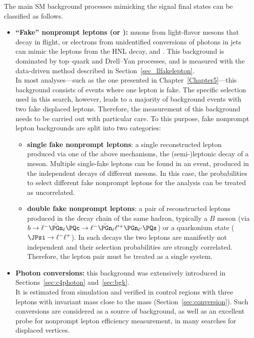 The main SM background processes mimicking the signal final states can be
classified as follows.
\begin{itemize}
\item \textbf{``Fake'' nonprompt leptons (\Pe or \PGm):}
  muons from light-flavor mesons that decay in flight, or electrons from
  unidentified conversions of photons in jets
  can mimic the \displ leptons from the HNL decay, \ltwo and
  \lthree.
  This background is dominated by top--quark and Drell--Yan processes,
  and is measured with the data-driven method described in
  Section~\ref{sec_llfakelepton}.\\
In most analyses---such as the one presented in Chapter~\ref{Chapter5}---this
background consists of events where one lepton is fake. 
The specific selection used in this search, however, leads to a majority of
background events with two fake displaced leptons. Therefore, the
measurement of this background needs to be carried out with particular care.
To this purpose, fake nonprompt lepton backgrounds are split into two
categories:
  \begin{itemize}
  \item \textbf{single fake nonprompt leptons}:
    a single reconstructed lepton produced via one of the above
    mechanisms, \eg the (semi-)leptonic decay of a meson.
    Multiple single-fake leptons can be found in an event,
    produced in the independent decays of different mesons.
    In this case, the probabilities to select different fake nonprompt
    leptons for the analysis can be treated as uncorrelated.
  \item \textbf{double fake nonprompt leptons}:
    a pair of reconstructed leptons produced in the decay chain of the
    same hadron, typically a $B$ meson (\eg via
    $b\to\ell^-\bar{\PGn}_{\ell}\PQc\to\ell^-\bar{\PGn}_{\ell}\ell^{\prime+}\PGn_{\ell^{\prime}}\PQs$)
    or a quarkonium state (\eg $\JPsi\to\ell^-\ell^+$).
    In such decays the two leptons are manifestly not independent and
    their selection probabilities are strongly correlated.
    Therefore, the lepton pair must be treated as a single system.
  \end{itemize}
\item \textbf{Photon conversions:} this background was extensively
 introduced in Sections~\ref{sec:c4photon} and~\ref{sec:bgk}.\\
  It is estimated from simulation and verified in control regions with
  three leptons with invariant mass close to the \PZ mass (Section~\ref{sec:conversion}).
  Such conversions are considered as a
  source of background, as well as an excellent probe for nonprompt
  lepton efficiency
 measurement, in many searches for displaced vertices.
\end{itemize}
 
